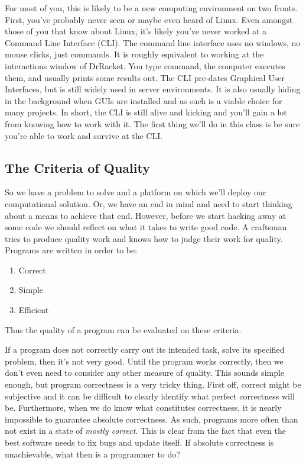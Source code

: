 \documentclass[]{tufte-handout}
\begin{document}
For most of you, this is likely to be a new computing environment on two fronts.  First, you've probably never seen or maybe even heard of Linux.  Even amongst those of you that know about Linux, it's likely you've never worked at a Command Line Interface (CLI).  The command line interface uses no windows, no mouse clicks, just commands.  It is roughly equivalent to working at the interactions window of DrRacket. You type command, the computer executes them, and usually prints some results out. The CLI pre-dates Graphical User Interfaces, but is still widely used in server environments.  It is also usually hiding in the background when GUIs are installed and as such is a viable choice for many projects. In short, the CLI is still alive and kicking and you'll gain a lot from knowing how to work with it.  The first thing we'll do in this class is be sure you're able to work and survive at the CLI.

\subsection{The Criteria of Quality}

So we have a problem to solve and a platform on which we'll deploy our computational solution. Or, we have an end in mind and need to start thinking about a means to achieve that end.  However, before we start hacking away at some code we should reflect on what it takes to write good code. A craftsman tries to produce quality work and knows how to judge their work for quality. Programs are written in order to be:
\begin{enumerate}
\item Correct 
\item Simple
\item Efficient
\end{enumerate}
Thus the quality of a program can be evaluated on these criteria. 

If a program does not correctly carry out its intended task, solve its specified problem, then it's not very good. Until the program works correctly, then we don't even need to consider any other measure of quality.  This sounds simple enough, but program correctness is a very tricky thing.  First off, correct might be subjective and it can be difficult to clearly identify what perfect correctness will be.  Furthermore, when we do know what constitutes correctness, it is nearly impossible to guarantee absolute correctness.  As such, programs more often than not exist in a state of \textit{mostly correct}.  This is clear from the fact that even the best software needs to fix bugs and update itself. If absolute correctness is unachievable, what then is a programmer to do?     
\end{document}
